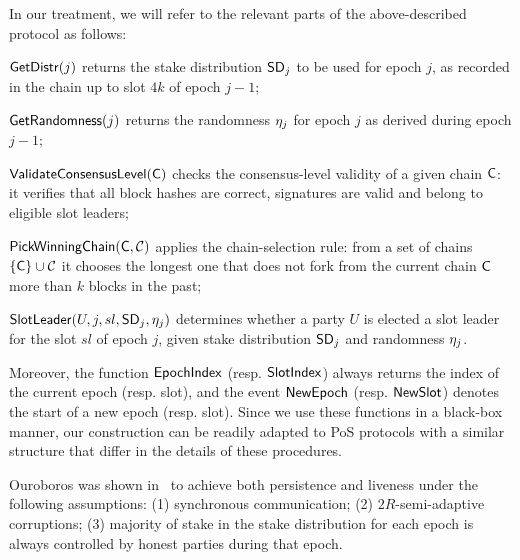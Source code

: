 In our treatment, we will refer to the relevant parts of the above-described protocol as
follows:
\begin{description}
\item
  $\mathsf{GetDistr}(j)$
  returns the stake distribution $\mathsf{SD}_j$ to be used for epoch $j$, as recorded in the
    chain up to slot $4k$ of epoch $j-1$;

\item
  $\mathsf{GetRandomness}(j)$
  returns the randomness $\eta_j$ for epoch $j$ as derived during epoch $j-1$;
\item
  $\mathsf{ValidateConsensusLevel}(\mathsf{C})$
  checks the consensus-level validity of a given chain $\mathsf{C}$: it verifies that all block hashes
    are correct, signatures are valid and belong to eligible slot leaders;
\item
  $\mathsf{PickWinningChain}(\mathsf{C},\mathcal{C})$
    applies the chain-selection rule: from a set of chains $\{\mathsf{C}\}\cup\mathcal{C}$ it
    chooses the longest one that does not fork from the current chain $\mathsf{C}$
    more than $k$ blocks in the past;
\item
  $\mathsf{SlotLeader}(U,j,sl,\mathsf{SD}_j,\eta_{j})$
  determines whether a party $U$ is elected a slot leader for the slot $sl$ of
    epoch $j$, given stake distribution $\mathsf{SD}_j$ and randomness $\eta_{j}$.
\end{description}
Moreover, the function $\mathsf{EpochIndex}$ (resp. $\mathsf{SlotIndex}$) always returns
the index of the current epoch (resp. slot), and the event $\mathsf{NewEpoch}$ (resp.
$\mathsf{NewSlot}$) denotes the start of a new epoch (resp. slot).
Since we use these functions in a black-box manner, our construction can be
readily adapted to PoS protocols with a similar structure that differ in the
details of these procedures.

Ouroboros was shown in~\cite{ouroboros} to achieve
both persistence and liveness
under the following assumptions:
(1) synchronous communication;
(2) $2R$-semi-adaptive corruptions;
(3) majority of stake in the stake distribution for each epoch is
always controlled by honest parties during that epoch.

